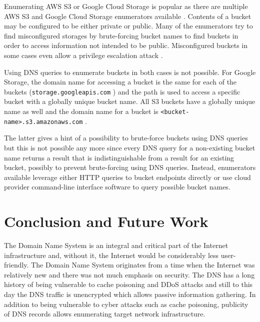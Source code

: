 Enumerating AWS S3 or Google Cloud Storage is popular as there are multiple AWS S3 and Google Cloud Storage enumerators available \cite{GCPBucket}\citep{AWSpentest}. Contents of a bucket may be configured to be either private or public. Many of the enumerators try to find misconfigured storages by brute-forcing bucket names to find buckets in order to access information not intended to be public. Misconfigured buckets in some cases even allow a privilege escalation attack \cite{GCPBucket}.

Using DNS queries to enumerate buckets in both cases is not possible. For Google Storage, the domain name for accessing a bucket is the same for each of the buckets (\texttt{storage.googleapis.com} \cite{googlebuckets}) and the path is used to access a specific bucket with a globally unique bucket name. All S3 buckets have a globally unique name as well and the domain name for a bucket is \texttt{<bucket-name>.s3.amazonaws.com} \cite{s3buckets}.

The latter gives a hint of a possibility to brute-force buckets using DNS queries but this is not possible any more \cite{S3enum} since every DNS query for a non-existing bucket name returns a result that is indistinguishable from a result for an existing bucket, possibly to prevent brute-forcing using DNS queries. Instead, enumerators available leverage either HTTP queries to bucket endpoints directly or use cloud provider command-line interface software to query possible bucket names.

\section{Conclusion and Future Work}

The Domain Name System is an integral and critical part of the Internet infrastructure and, without it, the Internet would be considerably less user-friendly. The Domain Name System originates from a time when the Internet was relatively new and there was not much emphasis on security. The DNS has a long history of being vulnerable to cache poisoning and DDoS attacks and still to this day the DNS traffic is unencrypted which allows passive information gathering. In addition to being vulnerable to cyber attacks such as cache poisoning, publicity of DNS records allows enumerating target network infrastructure.

